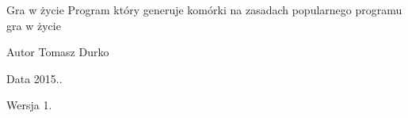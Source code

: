 \begin{DoxyParagraph}{Gra w życie}
Program który generuje komórki na zasadach popularnego programu gra w życie 
\end{DoxyParagraph}
\begin{DoxyAuthor}{Autor}
Tomasz Durko 
\end{DoxyAuthor}
\begin{DoxyDate}{Data}
2015.. 
\end{DoxyDate}
\begin{DoxyVersion}{Wersja}
1. 
\end{DoxyVersion}
